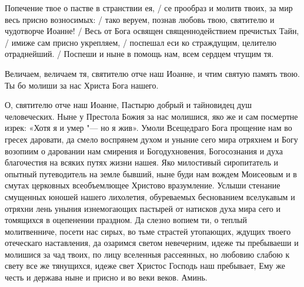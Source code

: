

Попечение твое о пастве в странствии ея, / се прообраз и молитв твоих, за мир весь присно возносимых: / тако веруем, познав любовь твою, святителю и чудотворче Иоанне! / Весь от Бога освящен священнодействием пречистых Тайн, / имиже сам присно укрепляем, / поспешал еси ко страждущим, целителю отраднейший. / Поспеши и ныне в помощь нам, всем сердцем чтущим тя.




Величаем, величаем тя, святителю отче наш Иоанне, и чтим святую память твою. Ты бо молиши за нас Христа Бога нашего.




О, святителю отче наш Иоанне, Пастырю добрый и тайновидец душ человеческих. Ныне у Престола Божия за нас молишися, яко же и сам посмертне изрек: «Хотя я и умер "--- но я жив». Умоли Всещедраго Бога прощение нам во гресех даровати, да смело воспрянем духом и уныние сего мира отряхнем и Богу возопиим о даровании нам смирения и Богодухновения, Богосознания и духа благочестия на всяких путях жизни нашея. Яко милостивый сиропитатель и опытный путеводитель на земле бывший, ныне буди нам вождем Моисеовым и в смутах церковных всеобъемлющее Христово вразумление. Услыши стенание смущенных юношей нашего лихолетия, обуреваемых беснованием вселукавым и отряхни лень уныния изнемогающих пастырей от натисков духа мира сего и томящихся в оцепенении праздном. Да слезно вопием ти, о теплый молитвенниче, посети нас сирых, во тьме страстей утопающих, ждущих твоего отеческаго наставления, да озаримся светом невечерним, идеже ты пребываеши и молишися за чад твоих, по лицу вселенныя рассеянных, но любовию слабою к свету все же тянущихся, идеже свет Христос Господь наш пребывает, Ему же честь и держава ныне и присно и во веки веков. Аминь.
\mychapterending
